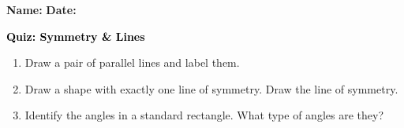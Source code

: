 \documentclass[12pt, letterpaper, fleqn]{article}
\begin{document}
\textbf{Name:} \underline{\hspace{5cm}}
\hfill
\textbf{Date:} \underline{\hspace{3cm}}\\

\begin{tcolorbox}[colback=customteal!20]
    \large\textcolor{black}{\textbf{Quiz: Symmetry \& Lines}}
\end{tcolorbox}
\begin{enumerate}[itemsep=3.5cm, leftmargin=0.6cm]
\item Draw a pair of parallel lines and label them.
\vspace{3.5cm}
\item Draw a shape with exactly one line of symmetry. Draw the line of symmetry.
\vspace{3.5cm}
\item Identify the angles in a standard rectangle. What type of angles are they?
\end{enumerate}
\end{document}
